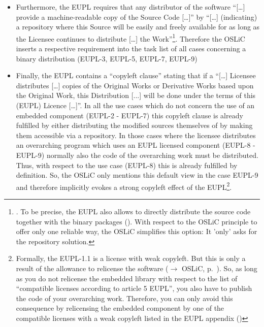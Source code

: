 \begin{itemize}
  \item Furthermore, the EUPL requires that any distributor of the software
  \enquote{[\ldots] provide a machine-readable copy of the Source Code [\ldots]}
  by \enquote{[\ldots] (indicating) a repository where this Source will be
  easily and freely available for as long as the Licensee continues to
  distribute [\ldots] the Work}\footnote{\cite[cf.][\nopage wp\
  §5]{EuplLicense2007en}. To be precise, the EUPL also allows to directly
  distribute the source code together with the binary packages
  (\cite[cf.][\nopage wp\ §3]{EuplLicense2007en}). With respect to the OSLiC
  principle to offer only one reliable way, the OSLiC simplifies this option:
  It 'only' asks for the repository solution.}. Therefore the OSLiC inserts a
  respective requirement into the task list of all cases concerning a binary
  distribution  (EUPL-3, EUPL-5, EUPL-7, EUPL-9)
  
  \item Finally, the EUPL contains a \enquote{copyleft clause} stating that if a
  \enquote{[\ldots] Licensee distributes [\ldots] copies of the Original Works
  or Derivative Works based upon the Original Work, this Distribution [...] will
  be done under the terms of this (EUPL) Licence [\ldots]}. In all the use cases
  which do not concern the use of an embedded component (EUPL-2 - EUPL-7) this
  copyleft clause is already fulfilled by either distributing the modified
  sources themselves of by making them accessible via a repository. In those
  cases where the licensee distributes an overarching program which uses an EUPL
  licensed component (EUPL-8 - EUPL-9) normally also the code of the overarching
  work must be distributed. Thus, with respect to the use case (EUPL-8) this is
  already fulfilled by definition. So, the OSLiC only mentions this default view
  in the case EUPL-9 and therefore implicitly evokes a strong copyleft effect of
  the EUPL\footnote{Formally, the EUPL-1.1 is a license with weak copyleft. But
  this is only a result of the allowance to relicense the software
  ($\rightarrow$ OSLiC, p.\ \pageref{sec:ProtectingPowerOfEupl}). So, as long as
  you do not relicense the embedded library with respect to the list of
  \enquote{compatible licenses according to article 5 EUPL}, you also have to
  publish the code of your overarching work. Therefore, you can only avoid this
  consequence by relicensing the embedded component by one of the compatible
  licenses with a weak copyleft listed in the EUPL appendix (\cite[cf.][\nopage
  wp §5 and Appendix]{EuplLicense2007en})}.
  

\end{itemize}








%
